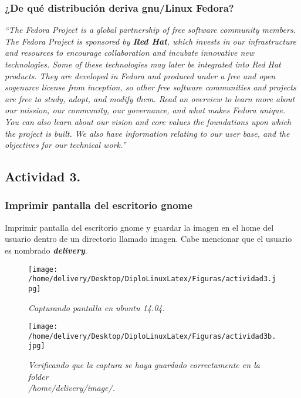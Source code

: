 \documentclass[a4paper,11pt,spanish]{article} %
\begin{document}
\subsubsection{¿De qué distribución deriva \ac{gnu}/Linux Fedora?} 


\emph{``The Fedora Project is a global partnership of free software community members. 
The Fedora Project is sponsored by \textbf{\emph{Red Hat}}, which invests in our infrastructure and resources to 
encourage collaboration and incubate innovative new technologies. Some of these technologies may later 
be integrated into Red Hat products. They are developed in Fedora and produced under a free and open 
sogenurce license from inception, so other free software communities and projects are free to study, adopt, 
and modify them.
Read an overview to learn more about our mission, our community, our governance, and what makes Fedora 
unique. You can also learn about our vision and core values the foundations upon which the project is 
built. We also have information relating to our user base, and the objectives for our technical work.''}

\cite{fedoraproject}

\subsection{Actividad 3.}

\subsubsection{Imprimir pantalla del escritorio \ac{gnome}}

Imprimir pantalla del escritorio \ac{gnome}
y guardar la imagen en el home del usuario dentro de un directorio llamado imagen. 
Cabe mencionar que el usuario es nombrado \textbf{\emph{delivery}}.

\begin{figure}[h!] 
\centering
\texttt{[image: /home/delivery/Desktop/DiploLinuxLatex/Figuras/actividad3.jpg]}
\caption{\emph{Capturando pantalla en ubuntu 14.04.}}
\end{figure}

\begin{figure}[h!] 
\centering
\texttt{[image: /home/delivery/Desktop/DiploLinuxLatex/Figuras/actividad3b.jpg]}
\caption{\emph{Verificando que la captura se haya guardado correctamente en la folder \\ 
/home/delivery/image/.}}
\end{figure}
\end{document}
